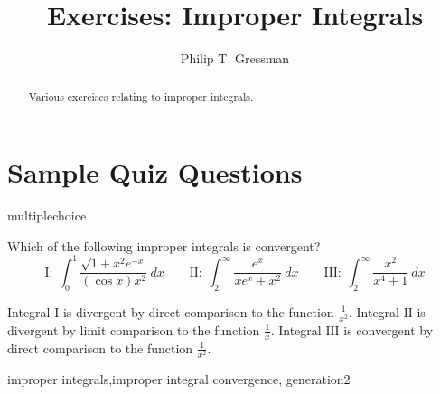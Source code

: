 \documentclass{ximera}
\title{Exercises: Improper Integrals}
\author{Philip T. Gressman}
\begin{document}
\begin{abstract}
Various exercises relating to improper integrals.
\end{abstract}
\maketitle


\section*{Sample Quiz Questions}

\begin{question}[ImpropCD01]
\begin{type}
multiplechoice
\end{type}
Which of the following improper integrals is convergent? 
\[ \mathrm{I}: \ \int_0^1\frac{\sqrt{{1}+{x^2}{e^{-x}}}}{{(\cos x)}{x^2}}~dx \qquad   \mathrm{II}: \ \int_{2}^\infty\frac{{e^{x}}}{{x}{e^{x}}+{x^2}}~dx \qquad  \mathrm{III}: \ \int_{2}^\infty\frac{{x^2}}{{x^4}+{1}}~dx\]
\begin{multiplechoice}
 \choicebreak
{}
\end{multiplechoice}
\begin{feedback}
Integral \(\mathrm{I}\) is divergent by direct comparison to the function \(\displaystyle \frac{{1}}{{x^2}}\). 
Integral \(\mathrm{II}\) is divergent by limit comparison to the function \(\displaystyle \frac{{1}}{{x}}\). 
Integral \(\mathrm{III}\) is convergent by direct comparison to the function \(\displaystyle \frac{{1}}{{x^2}}\).
\end{feedback}
\begin{keywords}
improper integrals,improper integral convergence, generation2
\end{keywords}
\end{question}
\end{document}
